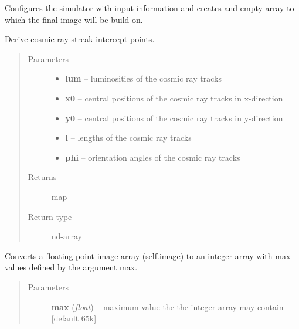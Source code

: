 \documentclass[a4paper,12pt,english]{sphinxmanual}
\begin{document}
\begin{fulllineitems}
\begin{fulllineitems}
\label{simulator:simulator.simulator.VISsimulator.configure}
Configures the simulator with input information and creates and empty array to which the final image will
be build on.

\end{fulllineitems}


\begin{fulllineitems}
\label{simulator:simulator.simulator.VISsimulator.cosmicRayIntercepts}
Derive cosmic ray streak intercept points.
\begin{quote}\begin{description}
\item[{Parameters}] \leavevmode\begin{itemize}
\item {} 
\textbf{lum} -- luminosities of the cosmic ray tracks

\item {} 
\textbf{x0} -- central positions of the cosmic ray tracks in x-direction

\item {} 
\textbf{y0} -- central positions of the cosmic ray tracks in y-direction

\item {} 
\textbf{l} -- lengths of the cosmic ray tracks

\item {} 
\textbf{phi} -- orientation angles of the cosmic ray tracks

\end{itemize}

\item[{Returns}] \leavevmode
map

\item[{Return type}] \leavevmode
nd-array

\end{description}\end{quote}

\end{fulllineitems}


\begin{fulllineitems}
\label{simulator:simulator.simulator.VISsimulator.discretise}
Converts a floating point image array (self.image) to an integer array with max values
defined by the argument max.
\begin{quote}\begin{description}
\item[{Parameters}] \leavevmode
\textbf{max} (\emph{float}) -- maximum value the the integer array may contain {[}default 65k{]}


\end{description}
\end{quote}
\end{fulllineitems}
\end{fulllineitems}
\end{document}
